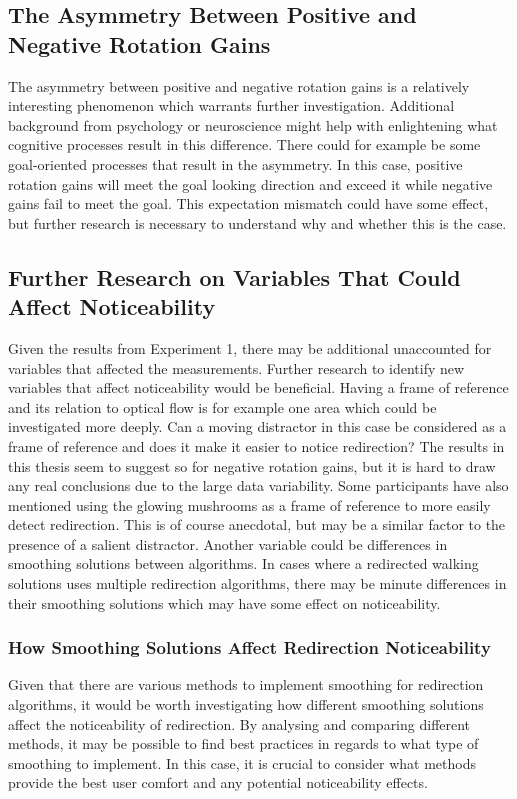 \subsection{The Asymmetry Between Positive and Negative Rotation Gains}
The asymmetry between positive and negative rotation gains is a relatively interesting phenomenon which warrants further investigation. Additional background from psychology or neuroscience might help with enlightening what cognitive processes result in this difference. There could for example be some goal-oriented processes that result in the asymmetry. In this case, positive rotation gains will meet the goal looking direction and exceed it while negative gains fail to meet the goal. This expectation mismatch could have some effect, but further research is necessary to understand why and whether this is the case. 
      
\subsection{Further Research on Variables That Could Affect Noticeability}
Given the results from Experiment 1, there may be additional unaccounted for variables that affected the measurements. Further research to identify new variables that affect noticeability would be beneficial. Having a frame of reference and its relation to optical flow is for example one area which could be investigated more deeply. Can a moving distractor in this case be considered as a frame of reference and does it make it easier to notice redirection? The results in this thesis seem to suggest so for negative rotation gains, but it is hard to draw any real conclusions due to the large data variability. Some participants have also mentioned using the glowing mushrooms as a frame of reference to more easily detect redirection. This is of course anecdotal, but may be a similar factor to the presence of a salient distractor. Another variable could be differences in smoothing solutions between algorithms. In cases where a redirected walking solutions uses multiple redirection algorithms, there may be minute differences in their smoothing solutions which may have some effect on noticeability. 

\subsubsection{How Smoothing Solutions Affect Redirection Noticeability} 
Given that there are various methods to implement smoothing for redirection algorithms, it would be worth investigating how different smoothing solutions affect the noticeability of redirection. By analysing and comparing different methods, it may be possible to find best practices in regards to what type of smoothing to implement. In this case, it is crucial to consider what methods provide the best user comfort and any potential noticeability effects. 

